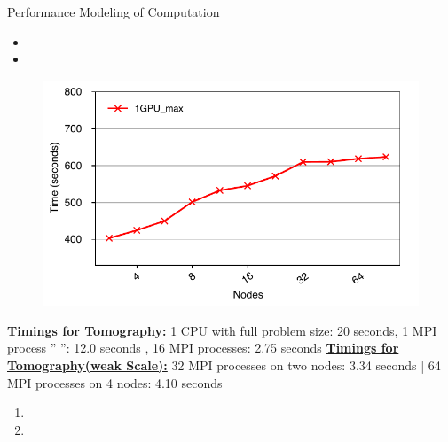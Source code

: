 \begin{frame}[label=scalingptycho]{Performance Modeling of Computation}
\begin{itemize}
\tiny \item \tiny 
\item \tiny 
\end{itemize} 
\begin{figure}[ht!]
\includegraphics[scale=0.5]{./plots/ptychoLib-hpcc-weakscale-intro.pdf}
\end{figure}
\underline{\bf Timings for Tomography:} 1 CPU with full problem size:
20 seconds, 1 MPI process '' '': 12.0 seconds , 16 MPI processes: 2.75 seconds 
\underline{\bf Timings for Tomography(weak Scale):} 32 MPI processes
on two nodes: 3.34 seconds | 64 MPI processes on 4 nodes: 4.10 seconds 

\begin{enumerate}
\tiny \item \tiny 
\item \tiny 
\end{enumerate}
\end{frame}




